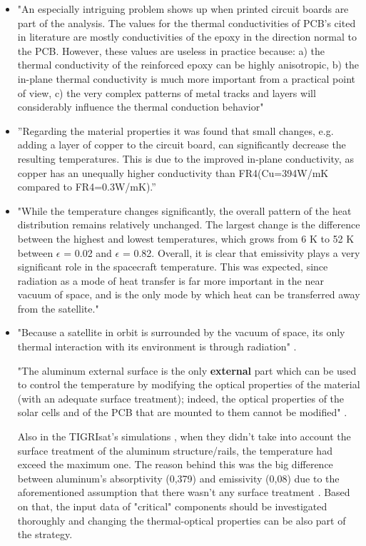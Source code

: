 \documentclass[final]{cubedoc}
\begin{document}
	\begin{itemize}
		\item "An especially intriguing problem shows up when printed circuit boards are part of the analysis. The values for the thermal conductivities of PCB’s cited in literature are mostly conductivities of the epoxy in the direction normal to the PCB. However, these values are useless in practice because: a) the thermal conductivity of the reinforced epoxy can be highly anisotropic, b) the in-plane thermal conductivity is much more important from a practical point of view, c) the very complex patterns of metal tracks and layers will considerably influence the thermal conduction behavior" \cite{lasance2002}
		\item ”Regarding the material properties it was found that small changes, e.g.  adding a layer of copper to the circuit board, can significantly decrease the resulting temperatures.  This is due to the improved in-plane conductivity, as copper has an unequally higher conductivity than FR4(Cu=394W/mK compared to FR4=0.3W/mK).” \cite{reiss2012} 
		\item "While the temperature changes significantly, the overall pattern of the heat distribution remains relatively unchanged. The largest change is the difference between the highest and lowest temperatures, which grows from 6 K to 52 K between $\epsilon$ = 0.02 and $\epsilon$ = 0.82. Overall, it is clear that emissivity plays a very significant role in the spacecraft temperature. This was expected, since radiation as a mode of heat transfer is far more important in the near vacuum of space, and is the only mode by which heat can be transferred away from the satellite." \cite{peake2014cubesat}
		\item "Because a satellite in orbit is surrounded by the vacuum of space, its only
		thermal interaction with its environment is through radiation" \cite{vanoutryve2008}.
		
		"The aluminum external surface is the only \textbf{external} part which can be used to control the temperature by modifying the optical properties of the material (with an adequate surface treatment); indeed, the optical properties of the solar cells and of the PCB that are mounted to them cannot be modified" \cite{paris2015}.
		
		Also in the TIGRIsat's simulations , when they didn't take into account the surface treatment of the aluminum structure/rails, the temperature had exceed the maximum one. The reason behind this was the big difference between aluminum's absorptivity (0,379) and emissivity (0,08) due to the aforementioned assumption that there wasn't any surface treatment \cite{paris2015}. Based on that, the input data of "critical" components should be investigated thoroughly and changing the thermal-optical properties can be also part of the strategy.
	\end{itemize}
	
\end{document}
